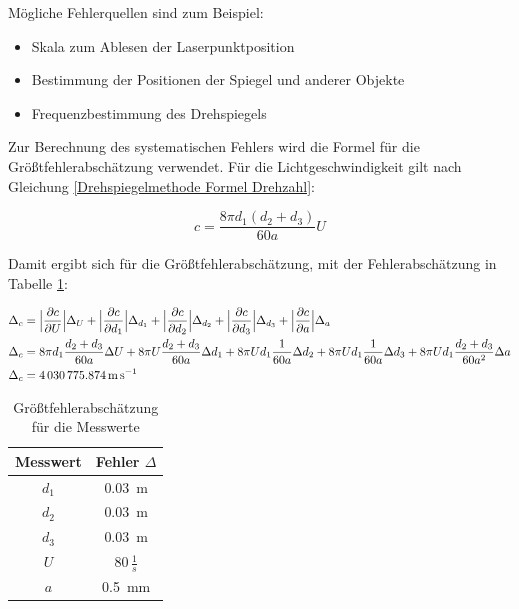 Mögliche Fehlerquellen sind zum Beispiel:
\begin{itemize}
    \item Skala zum Ablesen der Laserpunktposition
    \item Bestimmung der Positionen der Spiegel und anderer Objekte
    \item Frequenzbestimmung des Drehspiegels
\end{itemize}

Zur Berechnung des systematischen Fehlers wird die Formel für die Größtfehlerabschätzung verwendet. Für die Lichtgeschwindigkeit gilt nach Gleichung \ref{Drehspiegelmethode Formel Drehzahl}:

\begin{equation}
    c = \frac{8 \pi  d_1 (d_2 + d_3)}{60a} U
\end{equation}

Damit ergibt sich für die Größtfehlerabschätzung, mit der Fehlerabschätzung in Tabelle \ref{tab:Größtfehlerabschätzung}:

\begin{align}
    \Delta_c &= \Bigl| \frac{\partial c}{\partial U} \Bigl| \Delta_U + \Bigl|
    \frac{\partial c}{\partial d_1} \Bigl| \Delta_{d_1} + \Bigl| \frac{\partial
    c}{\partial d_2} \Bigl| \Delta_{d_2} + \Bigl| \frac{\partial c}{\partial d_3}
    \Bigl| \Delta_{d_3} + \Bigl| \frac{\partial c}{\partial a} \Bigl| \Delta_a \\
    \Delta_c &= 8 \pi d_1 \frac{d_2 + d_3}{60a}\Delta U + 8 \pi U \frac{d_2 + d_3}{60a}\Delta d_1 + 8 \pi U d_1 \frac{1}{60a} \Delta d_2 + 8 \pi U d_1 \frac{1}{60a} \Delta d_3 + 8 \pi U d_1 \frac{d_2 + d_3 }{60a^2} \Delta a \\
    \Delta_c &= \SI{4030775.874}{\metre\per\second}
\end{align}

\begin{table}[ht]
    \centering
    \caption{Größtfehlerabschätzung für die Messwerte}
    \begin{tabular}{c c}
    \hline
    Messwert & Fehler $\Delta$\\
    \hline
    $d_1$ & \SI{0.03}{\metre} \\
    $d_2$ & \SI{0.03}{\metre} \\
    $d_3$ & \SI{0.03}{\metre} \\
    $U$ & $80 \,  \frac{1}{s} $\\
    $a$ & \SI{0.5}{\milli\metre} \\
    \hline
    \end{tabular}
    \label{tab:Größtfehlerabschätzung}
\end{table}

